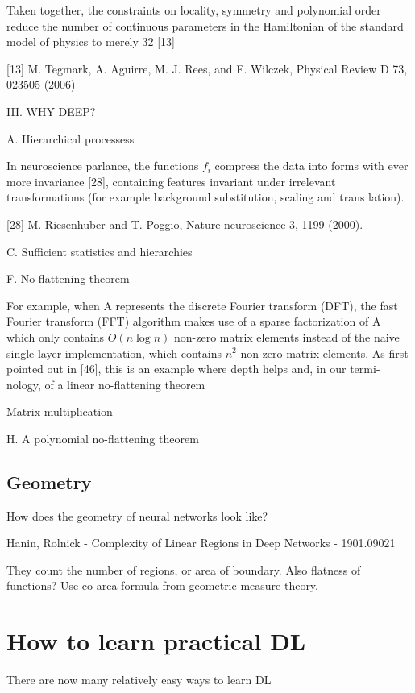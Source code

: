 \documentclass[english]{article}
\begin{document}
Taken together,
the constraints on locality, symmetry and polynomial order reduce the number of continuous parameters in the
Hamiltonian of the standard model of physics to merely
32 [13]


[13] M. Tegmark, A. Aguirre, M. J. Rees, and F. Wilczek,
Physical Review D 73, 023505 (2006)


\item III. WHY DEEP?

A. Hierarchical processess

In neuroscience parlance, the functions $f_i$ compress the
data into forms with ever more invariance [28], containing features invariant under irrelevant transformations
(for example background substitution, scaling and trans
lation).

[28] M. Riesenhuber and T. Poggio, Nature neuroscience 3, 1199 (2000).

C. Sufficient statistics and hierarchies

F. No-flattening theorem

For example, when A represents the discrete Fourier
transform (DFT), the fast Fourier transform (FFT) algorithm makes use of a sparse factorization of A which only
contains $O(n\log n)$ non-zero matrix elements instead of
the naive single-layer implementation, which contains $n^2$
non-zero matrix elements. As first pointed out in [46],
this is an example where depth helps and, in our termi-
nology, of a linear no-flattening theorem

Matrix multiplication

H. A polynomial no-flattening theorem


\eenum 

\eenum 

\subsection{Geometry}


\benum
\item How does the geometry of neural networks look like?


\item Hanin, Rolnick - Complexity of Linear Regions in Deep Networks - 1901.09021

They count the number of regions, or area of boundary. Also flatness of functions?
Use co-area formula from geometric measure theory.

\eenum 

\section{How to learn practical DL}
%
%
\bitem
\item There are now many relatively easy ways to learn DL
\bitem
\end{document}
